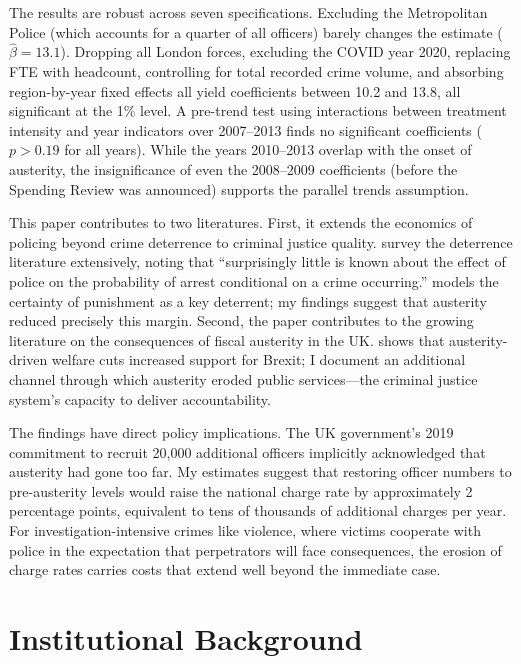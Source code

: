 \documentclass[12pt]{article}
\begin{document}
The results are robust across seven specifications. Excluding the Metropolitan Police (which accounts for a quarter of all officers) barely changes the estimate ($\hat{\beta} = 13.1$). Dropping all London forces, excluding the COVID year 2020, replacing FTE with headcount, controlling for total recorded crime volume, and absorbing region-by-year fixed effects all yield coefficients between 10.2 and 13.8, all significant at the 1\% level. A pre-trend test using interactions between treatment intensity and year indicators over 2007--2013 finds no significant coefficients ($p > 0.19$ for all years). While the years 2010--2013 overlap with the onset of austerity, the insignificance of even the 2008--2009 coefficients (before the Spending Review was announced) supports the parallel trends assumption.

This paper contributes to two literatures. First, it extends the economics of policing beyond crime deterrence to criminal justice quality. \citet{chalfin2015} survey the deterrence literature extensively, noting that ``surprisingly little is known about the effect of police on the probability of arrest conditional on a crime occurring.'' \citet{becker1968} models the certainty of punishment as a key deterrent; my findings suggest that austerity reduced precisely this margin. Second, the paper contributes to the growing literature on the consequences of fiscal austerity in the UK. \citet{fetzer2019} shows that austerity-driven welfare cuts increased support for Brexit; I document an additional channel through which austerity eroded public services---the criminal justice system's capacity to deliver accountability.

The findings have direct policy implications. The UK government's 2019 commitment to recruit 20,000 additional officers implicitly acknowledged that austerity had gone too far. My estimates suggest that restoring officer numbers to pre-austerity levels would raise the national charge rate by approximately 2 percentage points, equivalent to tens of thousands of additional charges per year. For investigation-intensive crimes like violence, where victims cooperate with police in the expectation that perpetrators will face consequences, the erosion of charge rates carries costs that extend well beyond the immediate case.


\section{Institutional Background}
\end{document}
